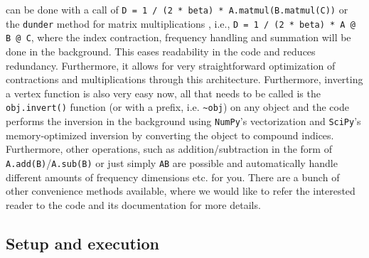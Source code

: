 \documentclass[../../main.tex]{subfiles}
\begin{document}
can be done with a call of \texttt{D = 1 / (2 * beta) * A.matmul(B.matmul(C))} or the \texttt{dunder} method for matrix multiplications , i.e., \texttt{D = 1 / (2 * beta) * A @ B @ C}, where the index contraction, frequency handling and summation will be done in the background. This eases readability in the code and reduces redundancy. Furthermore, it allows for very straightforward optimization of contractions and multiplications through this architecture. Furthermore, inverting a vertex function is also very easy now, all that needs to be called is the \texttt{obj.invert()} function (or with a \say{\sim} prefix, i.e. \texttt{\sim obj}) on any object and the code performs the inversion in the background using \texttt{NumPy}'s vectorization and \texttt{SciPy}'s memory-optimized inversion by converting the object to compound indices. Furthermore, other operations, such as addition/subtraction in the form of \texttt{A.add(B)}/\texttt{A.sub(B)} or just simply \texttt{A\pm B} are possible and automatically handle different amounts of frequency dimensions etc. for you. There are a bunch of other convenience methods available, where we would like to refer the interested reader to the code and its documentation for more details.


\subsection{Setup and execution}
\end{document}
